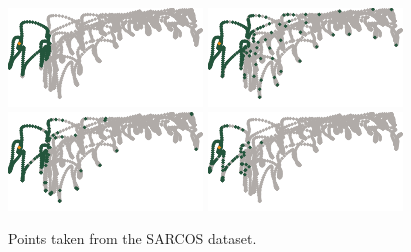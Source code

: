 \documentclass[review,supplement,onefignum,onetabnum]{siamonline220329}
\begin{document}
\begin{figure}[H]
  \centering
  \includegraphics{figures/precompiled/sarcos2/points_1.pdf}%
  \quad
  \includegraphics{figures/precompiled/sarcos2/points_2.pdf}%
  \quad
  \includegraphics{figures/precompiled/sarcos2/points_3.pdf}%
  \quad
  \includegraphics{figures/precompiled/sarcos2/points_4.pdf}%
  \caption{
    Points taken from the SARCOS dataset.
  }
\end{figure}
\end{document}
